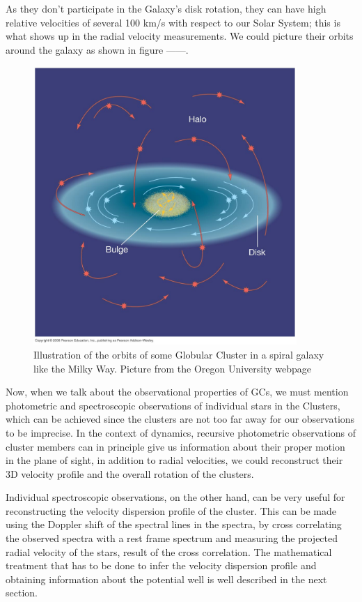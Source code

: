 As they don't participate in the Galaxy's disk rotation, they can have high relative velocities of several 100 km/s with respect to our Solar System; this is what shows up in the radial velocity measurements. We could picture their orbits around the galaxy as shown in figure ------.

\begin{figure}[H]
\centering
\includegraphics[width=10cm]{images/orbits_gcs.jpg}
\caption[Illustration of the orbits of Globular Clusters around a spiral galaxy]{Illustration of the orbits of some Globular Cluster in a spiral galaxy like the Milky Way. Picture from the Oregon University webpage}
\end{figure}

Now, when we talk about the observational properties of GCs, we must mention photometric and spectroscopic observations of individual stars in the Clusters, which can be achieved since the clusters are not too far away for our observations to be imprecise. In the context of dynamics, recursive photometric observations of cluster members can in principle give us information about their proper motion in the plane of sight, in addition to radial velocities, we could reconstruct their 3D velocity profile and the overall rotation of the clusters. 

Individual spectroscopic observations, on the other hand, can be very useful for reconstructing the velocity dispersion profile of the cluster. This can be made using the Doppler shift of the spectral lines in the spectra, by cross correlating the observed spectra with a rest frame spectrum and measuring the projected radial velocity of the stars, result of the cross correlation. The mathematical treatment that has to be done to infer the velocity dispersion profile and obtaining information about the potential well is well described in the next section.

